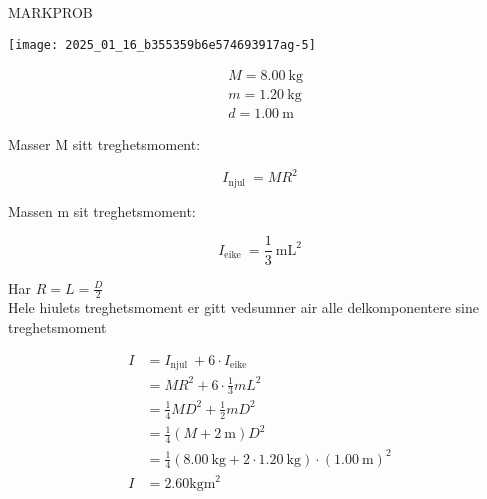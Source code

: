 \documentclass[10pt]{article}
\begin{document}
MARKPROB

\begin{center}
\texttt{[image: 2025\_01\_16\_b355359b6e574693917ag-5]}
\end{center}

$$
\begin{aligned}
& M=8.00 \mathrm{~kg} \\
& m=1.20 \mathrm{~kg} \\
& d=1.00 \mathrm{~m}
\end{aligned}
$$

Masser M sitt treghetsmoment:

$$
I_{\text {njul }}=M R^{2}
$$

Massen m sit treghetsmoment:

$$
I_{\text {eike }}=\frac{1}{3} \mathrm{~mL}^{2}
$$

Har $R=L=\frac{D}{2}$\\
Hele hiulets treghetsmoment er gitt vedsumner air alle delkomponentere sine treghetsmoment

$$
\begin{aligned}
I & =I_{\text {njul }}+6 \cdot I_{\text {eike }} \\
& =M R^{2}+6 \cdot \frac{1}{3} m L^{2} \\
& =\frac{1}{4} M D^{2}+\frac{1}{2} m D^{2} \\
& =\frac{1}{4}(M+2 \mathrm{~m}) D^{2} \\
& =\frac{1}{4}(8.00 \mathrm{~kg}+2 \cdot 1.20 \mathrm{~kg}) \cdot(1.00 \mathrm{~m})^{2} \\
I & =2.60 \mathrm{kgm}^{2}
\end{aligned}
$$
\end{document}
